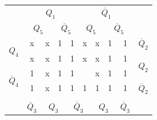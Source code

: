 \documentclass[a4paper,14pt]{article}
\begin{document}
\begin{table}[H]
\begin{minipage}{.5\linewidth}
\begin{tabular}{cccccccccc}
\end{tabular}
	\end{minipage}%
	\begin{minipage}{.5\linewidth}
		\centering
\begin{tabular}{cccccccccc}
	& \multicolumn{4}{c}{$Q_1$}                                                                         & \multicolumn{4}{c}{$\overline{Q}_1$}                                                              &                        \\
	& \multicolumn{2}{c}{$Q_5$}                       & \multicolumn{2}{c}{$\overline{Q}_5$}            & \multicolumn{2}{c}{$Q_5$}                       & \multicolumn{2}{c}{$\overline{Q}_5$}            &                        \\ \cline{2-9}
	\multicolumn{1}{c|}{\multirow{2}{*}{$Q_4$}}            & \multicolumn{1}{c|}{x} & \multicolumn{1}{c|}{x} & \multicolumn{1}{c|}{1} & \multicolumn{1}{c|}{1} & \multicolumn{1}{c|}{x} & \multicolumn{1}{c|}{x} & \multicolumn{1}{c|}{1} & \multicolumn{1}{c|}{1} & $\overline{Q}_2$       \\ \cline{2-9}
	\multicolumn{1}{c|}{}                                  & \multicolumn{1}{c|}{x} & \multicolumn{1}{c|}{x} & \multicolumn{1}{c|}{1} & \multicolumn{1}{c|}{1} & \multicolumn{1}{c|}{x} & \multicolumn{1}{c|}{x} & \multicolumn{1}{c|}{1} & \multicolumn{1}{c|}{1} & \multirow{2}{*}{$Q_2$} \\ \cline{2-9}
	\multicolumn{1}{c|}{\multirow{2}{*}{$\overline{Q}_4$}} & \multicolumn{1}{c|}{1} & \multicolumn{1}{c|}{x} & \multicolumn{1}{c|}{1} & \multicolumn{1}{c|}{1} & \multicolumn{1}{c|}{}  & \multicolumn{1}{c|}{x} & \multicolumn{1}{c|}{1} & \multicolumn{1}{c|}{1} &                        \\ \cline{2-9}
	\multicolumn{1}{c|}{}                                  & \multicolumn{1}{c|}{1} & \multicolumn{1}{c|}{x} & \multicolumn{1}{c|}{1} & \multicolumn{1}{c|}{1} & \multicolumn{1}{c|}{1} & \multicolumn{1}{c|}{1} & \multicolumn{1}{c|}{1} & \multicolumn{1}{c|}{1} & $\overline{Q}_2$       \\ \cline{2-9}
	&                        & \multicolumn{2}{c}{}                            & \multicolumn{2}{c}{}                            & \multicolumn{2}{c}{}                            &                        &                        \\
	& $\overline{Q}_3$       & \multicolumn{2}{c}{$Q_3$}                       & \multicolumn{2}{c}{$\overline{Q}_3$}            & \multicolumn{2}{c}{$Q_3$}                       & $\overline{Q}_3$       &                       
\end{tabular}
	\end{minipage} 
\end{table}
\end{document}
